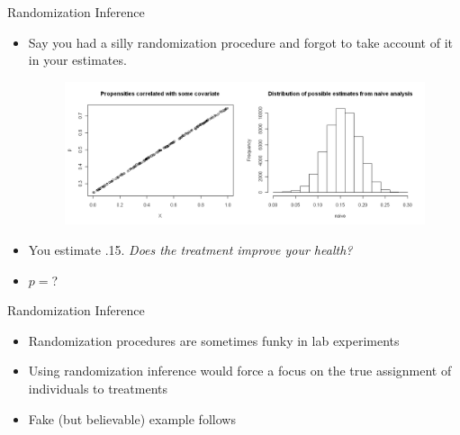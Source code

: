 \documentclass[
  11pt,
  ignorenonframetext,
]{beamer}
\begin{document}
\begin{frame}{Randomization Inference}
\protect\hypertarget{randomization-inference-3}{}
\begin{itemize}
    \item  Say you had a silly randomization procedure and forgot to take account of it in your estimates.
        \begin{figure}[htbp]
            \centering
                \includegraphics[width=.9\textwidth]{figs/pw2.png}
            \label{fig:pweight}
        \end{figure}
    \item You estimate .15. \textsl{Does the treatment improve your health?}
    \item $p=$?
\end{itemize}
\end{frame}

\begin{frame}{Randomization Inference}
\protect\hypertarget{randomization-inference-4}{}
\begin{itemize}
    \item  Randomization procedures are sometimes funky in lab experiments
    \item Using randomization inference would force a focus on the true assignment of individuals to treatments
    \item Fake (but believable) example follows 
\end{itemize}
\end{frame}
\end{document}

